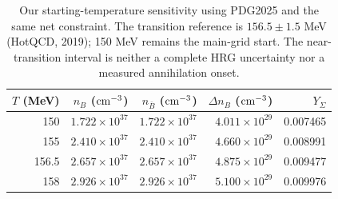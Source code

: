 \begin{table}[t]\centering\small
\caption{Our starting-temperature sensitivity using PDG2025 and the same net constraint. The transition reference is $156.5\pm1.5$ MeV (HotQCD, 2019); 150 MeV remains the main-grid start. The near-transition interval is neither a complete HRG uncertainty nor a measured annihilation onset.}\label{tab:initialT}
\setlength{\tabcolsep}{11pt}\renewcommand{\arraystretch}{1.14}
\begin{tabular}{rrrrr}\toprule
$T$ (MeV) & $n_B$ (${\rm cm^{-3}}$) & $n_{\bar B}$ (${\rm cm^{-3}}$) & $\Delta n_B$ (${\rm cm^{-3}}$) & $Y_\Sigma$ \\ \midrule
150 & $1.722\times10^{37}$ & $1.722\times10^{37}$ & $4.011\times10^{29}$ & 0.007465 \\
155 & $2.410\times10^{37}$ & $2.410\times10^{37}$ & $4.660\times10^{29}$ & 0.008991 \\
156.5 & $2.657\times10^{37}$ & $2.657\times10^{37}$ & $4.875\times10^{29}$ & 0.009477 \\
158 & $2.926\times10^{37}$ & $2.926\times10^{37}$ & $5.100\times10^{29}$ & 0.009976 \\
\bottomrule\end{tabular}\end{table}
